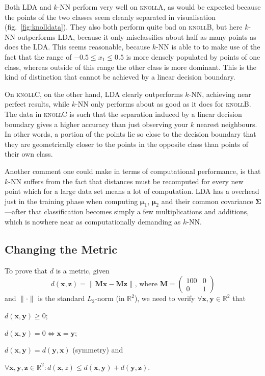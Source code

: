\documentclass{article}
\newcommand{\vect}[1]{\ensuremath{\boldsymbol{\mathbf{#1}}}\xspace}
\newcommand{\knollA}{\textsc{knollA}\xspace}
\newcommand{\knollB}{\textsc{knollB}\xspace}
\newcommand{\knollC}{\textsc{knollC}\xspace}
\begin{document}
Both LDA and $k$-NN perform very well on \knollA, as would be expected because the points of the two classes seem cleanly separated in visualisation (fig.~\ref{fig:knolldata}). They also both perform quite bad on \knollB, but here $k$-NN outperforms LDA, because it only misclassifies about half as many points as does the LDA. This seems reasonable, because $k$-NN is able to to make use of the fact that the range of $-0.5 \leq x_1 \leq 0.5$ is more densely populated by points of one class, whereas outside of this range the other class is more dominant. This is the kind of distinction that cannot be achieved by a linear decision boundary.

On \knollC, on the other hand, LDA clearly outperforms $k$-NN, achieving near perfect results, while $k$-NN only performs about as good as it does for \knollB. The data in \knollC is such that the separation induced by a linear decision boundary gives a higher accuracy than just observing your $k$ nearest neighbours. In other words, a portion of the points lie so close to the decision boundary that they are geometrically closer to the points in the opposite class than points of their own class.

Another comment one could make in terms of computational performance, is that $k$-NN suffers from the fact that distances must be recomputed for every new point which for a large data set means a lot of computation. LDA has a overhead just in the training phase when computing $\vect{\mu}_1$, $\vect{\mu}_2$ and their common covariance \vect{\Sigma}---after that classification becomes simply a few multiplications and additions, which is nowhere near as computationally demanding as $k$-NN.

\subsection{Changing the Metric}

To prove that $d$ is a metric, given
\[
d(\vect{x},\vect{z}) = \|\vect{M}\vect{x} - \vect{M}\vect{z}\|\text{,
  where } \vect{M} = \begin{pmatrix} 100 & 0 \\ 0 & 1\end{pmatrix}
\]
and $\|\cdot\|$ is the standard $L_2$-norm (in $\mathbb{R}^2$), we
need to verify $\forall \vect{x},\vect{y}\in \mathbb{R}^2$ that
\begin{inparaenum}[1)]
  \item $d(\vect{x},\vect{y}) \geq 0$; 
  \item $d(\vect{x},\vect{y}) = 0 \Leftrightarrow \vect{x} = \vect{y}$;
  \item $d(\vect{x},\vect{y}) =  d(\vect{y},\vect{x})$ (symmetry) and
  \item $\forall \vect{x},\vect{y},\vect{z} \in \mathbb{R}^2 : d(\vect{x},z) \leq d(\vect{x},\vect{y}) + d(\vect{y},\vect{z})$.
\end{inparaenum}
\end{document}

